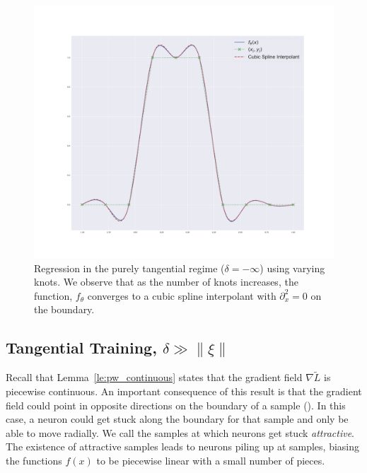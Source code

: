 \begin{figure}
    \includegraphics[width=\linewidth]{figures/cubic_spline_10k.pdf}
    \endminipage
    \caption{Regression in the purely tangential regime ($\delta = -\infty$) using varying knots. We observe that as the number of knots increases, the function, $f_\theta$ converges to a cubic spline interpolant with $\partial_x^2 = 0$ on the boundary.}
    \label{fig:radial_trajectores}
\end{figure}



















\subsection{Tangential Training, $\delta \gg \|\xi\|$}



Recall that Lemma~\ref{le:pw_continuous} states that the gradient field $\nabla \tilde{L}$ is piecewise continuous. An important consequence of this result is that the gradient field could point in opposite directions on the boundary of a sample (). In this case, a neuron could get stuck along the boundary for that sample and only be able to move radially. We call the samples at which neurons get stuck \emph{attractive}. The existence of attractive samples leads to neurons piling up at samples, biasing the functions $f(x)$ to be piecewise linear with a small number of pieces.


